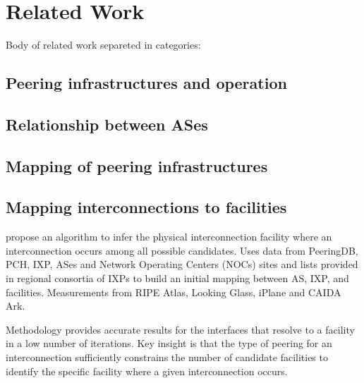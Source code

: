 \chapter{Related Work}\label{cap:related-work}
\thispagestyle{empty}

	Body of related work separeted in categories:

	\section{Peering infrastructures and operation}
	\label{sec:rel-work-peering-infra}

	\cite{Ager:2012, Richter:2014, Chatzis:2013:BUL:2504730.2504746, DissectingBrazilianIXP}

	\section{Relationship between ASes}
	\label{sec:rel-work-relat-as}

	\cite{Giotsas:2014:ICR:2663716.2663743, Giotsas:2015:MPI:2716281.2836122, Luckie:2013:RCC:2504730.2504735}

	\section{Mapping of peering infrastructures}
	\label{sec:rel-work-mapping-peer}

	\cite{Augustin:2009:IM:1644893.1644934, nomikos2016traixroute}

	\section{Mapping interconnections to facilities}
	\label{sec:rel-work-mapping-facility}

	\cite{Giotsas:2015:MPI:2716281.2836122} propose an algorithm to infer the physical interconnection facility where an interconnection occurs among all possible candidates. Uses data from PeeringDB, PCH, IXP, ASes and Network Operating Centers (NOCs) sites and lists provided in regional consortia of IXPs to build an initial mapping between AS, IXP, and facilities.
	Measurements from RIPE Atlas, Looking Glass, iPlane and CAIDA Ark.
	
	Methodology provides accurate results for the interfaces that resolve to a facility in a low number of iterations. Key insight is that the type of peering for an interconnection sufficiently constrains the number of candidate facilities to identify the specific facility where a given interconnection occurs.
	
